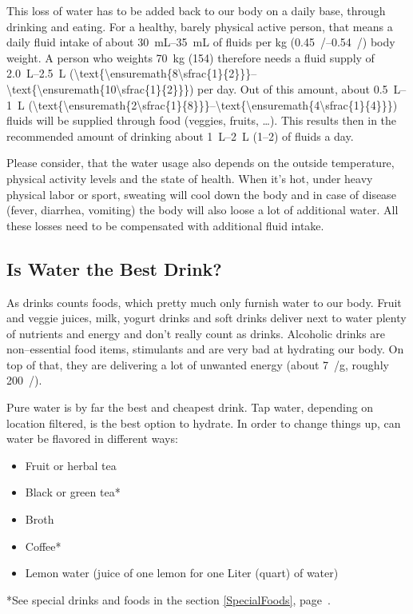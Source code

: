 \documentclass[../main.tex]{subfiles}
\begin{document}
  This loss of water has to be added back to our body on a daily base, through drinking and eating.
  For a healthy, barely physical active person, that means a daily fluid intake of about \SIrange{30}{35}{\mL} of fluids per \unit{\kg}
  (\SIrange{0.45}{0.54}{\floz/\lbs}) body weight.
  A person who weights \SI{70}{\kg} (\SI{154}{\lbs}) therefore needs a fluid supply of
  \SIrange{2.0}{2.5}{\L}
  (\SIrange[parse-numbers=false]{\text{\ensuremath{8\sfrac{1}{2}}}}{\text{\ensuremath{10\sfrac{1}{2}}}}{\cup}) per day.
  Out of this amount, about \SIrange{0.5}{1}{\L}
  (\SIrange[parse-numbers=false]{\text{\ensuremath{2\sfrac{1}{8}}}}{\text{\ensuremath{4\sfrac{1}{4}}}}{\cup})
  fluids will be supplied through food (veggies, fruits, \ldots).
  This results then in the recommended amount of drinking about \SIrange{1}{2}{\L} (\SIrange{1}{2}{\quart}) of fluids a day.

  Please consider, that the water usage also depends on the outside temperature, physical activity levels and the state of health.
  When it's hot, under heavy physical labor or sport, sweating will cool down the body and
  in case of disease (fever, diarrhea, vomiting) the body will also loose a lot of additional water.
  All these losses need to be compensated with additional fluid intake.

  \subsection{Is Water the Best Drink?}

  As drinks counts foods, which pretty much only furnish water to our body. 
  Fruit and veggie juices, milk, yogurt drinks and soft drinks deliver next to water plenty of nutrients and energy and  don't really count as drinks.
  Alcoholic drinks are non--essential food items, stimulants and are very bad at hydrating our body.
  On top of that, they are delivering a lot of unwanted energy (about \SI{7}{\kcal/\g}, roughly \SI{200}{\kcal/\oz}).

  
  Pure water is by far the best and cheapest drink. Tap water, depending on location filtered, is the best option to hydrate.
  In order to change things up, can water be flavored in different ways:
  \begin{itemize}
  \item Fruit or herbal tea
  \item Black or green tea* 
  \item Broth
  \item Coffee*
    \item Lemon water (juice of one lemon for one Liter (quart) of water)
  \end{itemize}
{\footnotesize{*See special drinks and foods in the section \ref{SpecialFoods}, page~\pageref{SpecialFoods}.}}
  
\end{document}
